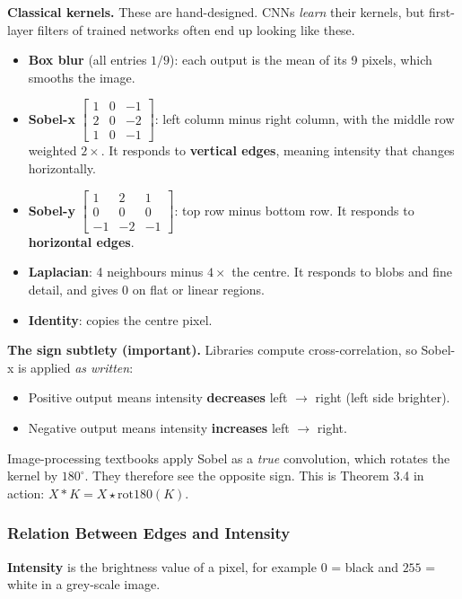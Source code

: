 \textbf{Classical kernels.} These are hand-designed. CNNs \emph{learn} their kernels, but first-layer filters of trained networks often end up looking like these.
\begin{itemize}[nosep]
  \item \textbf{Box blur} (all entries $1/9$): each output is the mean of its 9 pixels, which smooths the image.
  \item \textbf{Sobel-x} $\begin{bmatrix}1&0&-1\\2&0&-2\\1&0&-1\end{bmatrix}$: left column minus right column, with the middle row weighted $2\times$. It responds to \textbf{vertical edges}, meaning intensity that changes horizontally.
  \item \textbf{Sobel-y} $\begin{bmatrix}1&2&1\\0&0&0\\-1&-2&-1\end{bmatrix}$: top row minus bottom row. It responds to \textbf{horizontal edges}.
  \item \textbf{Laplacian}: 4 neighbours minus $4\times$ the centre. It responds to blobs and fine detail, and gives 0 on flat or linear regions.
  \item \textbf{Identity}: copies the centre pixel.
\end{itemize}

\textbf{The sign subtlety (important).} Libraries compute cross-correlation, so Sobel-x is applied \emph{as written}:
\begin{itemize}[nosep]
  \item Positive output means intensity \textbf{decreases} left $\to$ right (left side brighter).
  \item Negative output means intensity \textbf{increases} left $\to$ right.
\end{itemize}
Image-processing textbooks apply Sobel as a \emph{true} convolution, which rotates the kernel by $180^\circ$. They therefore see the opposite sign. This is Theorem 3.4 in action: $X * K = X \star \mathrm{rot180}(K)$.

\subsubsection*{Relation Between Edges and Intensity}

\textbf{Intensity} is the brightness value of a pixel, for example $0$ = black and $255$ = white in a grey-scale image.

